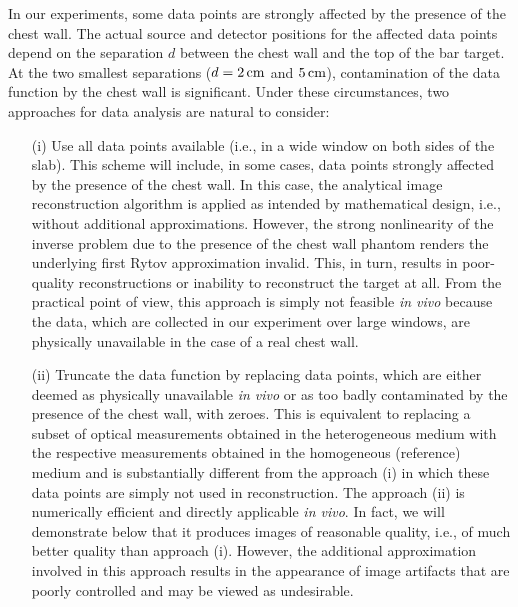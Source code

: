In our experiments, some data points are strongly affected by the 
presence of the chest wall. The actual source and detector positions for the 
affected data points depend on the separation $d$ between the chest wall and 
the top of the bar target. At the two smallest separations ($d=2\,{\rm cm}$ 
and $5\,{\rm cm}$), contamination of the data function by the chest wall is 
significant. Under these circumstances, two approaches for data analysis are 
natural to consider:

\begin{itemize}
  
\item[(i)] Use all data points available (i.e., in a wide window on
  both sides of the slab). This scheme will include, in some cases,
  data points strongly affected by the presence of the chest wall. In
  this case, the analytical image reconstruction algorithm is applied
  as intended by mathematical design, i.e., without additional
  approximations. However, the strong nonlinearity of the inverse
  problem due to the presence of the chest wall phantom renders the
  underlying first Rytov approximation invalid. This, in turn, results
  in poor-quality reconstructions or inability to reconstruct the
  target at all. From the practical point of view, this approach is
  simply not feasible {\em in vivo} because the data, which are
  collected in our experiment over large windows, are physically
  unavailable in the case of a real chest wall.

\item[(ii)] Truncate the data function by replacing data points, which
  are either deemed as physically unavailable {\em in vivo} or as too
  badly contaminated by the presence of the chest wall, with zeroes.
  This is equivalent to replacing a subset of optical measurements
  obtained in the heterogeneous medium with the respective measurements
  obtained in the homogeneous (reference) medium and is substantially
  different from the approach (i) in which these data points are
  simply not used in reconstruction. The approach (ii) is numerically
  efficient and directly applicable {\em in vivo}. In fact, we will
  demonstrate below that it produces images of reasonable quality,
  i.e., of much better quality than approach (i). However, the
  additional approximation involved in this approach results in the
  appearance of image artifacts that are poorly controlled and may be
  viewed as undesirable.

\end{itemize}

